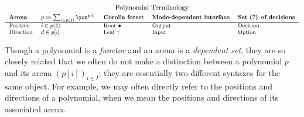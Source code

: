 \documentclass[Book-Poly]{subfiles}
\begin{document}
\begin{equation}\label{eqn.table_terminology}
\footnotesize
\begin{tabular}{lllll}
\multicolumn{5}{c}{\normalsize Polynomial Terminology}\\[3pt]
\textbf{Arena} & $p \coloneqq \sum_{i \in p(\1)} \yon^{p[i]}$ & \textbf{Corolla forest} & \textbf{Mode-dependent interface} & \textbf{Set (?) of decisions}\\\hline
Position & $i \in p(\1)$ & Root $\bullet$ & Output & Decision\\
Direction & $d \in p[i]$ & Leaf $\uparrow$ & Input & Option
\end{tabular}
\end{equation}

\begin{remark}
Though a polynomial is a \emph{functor} and an arena is a \emph{dependent set}, they are so closely related that we often do not make a distinction between a polynomial $p$ and its arena $(p[i])_{i \in I}$; they are essentially two different syntaxes for the same object.
For example, we may often directly refer to the positions and directions of a polynomial, when we mean the positions and directions of its associated arena.
\end{remark}
\end{document}
